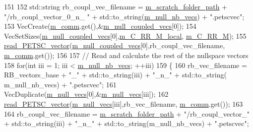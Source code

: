 \begin{DoxyCode}
151     
152     std::string rb\_coupl\_vec\_filename = \hyperlink{classcarl_1_1_f_e_t_i___operations_ad6d35bc9b5221d45452fbc8931f22055}{m\_scratch\_folder\_path} + \textcolor{stringliteral}{"/rb\_coupl\_vector\_0\_n\_
      "} + std::to\_string(\hyperlink{classcarl_1_1_f_e_t_i___operations_a6be71b08544858c4b4609bf2a2927a17}{m\_null\_nb\_vecs}) + \textcolor{stringliteral}{".petscvec"};
153     VecCreate(\hyperlink{classcarl_1_1_f_e_t_i___operations_a8cb0ed286667fc9f3ebc2d8ef2a3e13b}{m\_comm}.get(),&\hyperlink{classcarl_1_1_f_e_t_i___operations_a162af22ae7e7410cf5ce6fe07f301e63}{m\_null\_coupled\_vecs}[0]);
154     VecSetSizes(\hyperlink{classcarl_1_1_f_e_t_i___operations_a162af22ae7e7410cf5ce6fe07f301e63}{m\_null\_coupled\_vecs}[0],\hyperlink{classcarl_1_1_f_e_t_i___operations_a2401278970b5cc7087ebbf1746c64d35}{m\_C\_RR\_M\_local},
      \hyperlink{classcarl_1_1_f_e_t_i___operations_a8212c6fec9ded9faeb36cc3ce18f2e35}{m\_C\_RR\_M});
155     \hyperlink{namespacecarl_a4d0e2c60b0765dc8182c95362c5d329a}{read\_PETSC\_vector}(\hyperlink{classcarl_1_1_f_e_t_i___operations_a162af22ae7e7410cf5ce6fe07f301e63}{m\_null\_coupled\_vecs}[0],rb\_coupl\_vec\_filename, 
      \hyperlink{classcarl_1_1_f_e_t_i___operations_a8cb0ed286667fc9f3ebc2d8ef2a3e13b}{m\_comm}.get());
156 
157     \textcolor{comment}{// Read and calculate the rest of the nullspace vectors}
158     \textcolor{keywordflow}{for}(\textcolor{keywordtype}{int} iii = 1; iii < \hyperlink{classcarl_1_1_f_e_t_i___operations_a6be71b08544858c4b4609bf2a2927a17}{m\_null\_nb\_vecs}; ++iii)
159     \{
160         rb\_vec\_filename = RB\_vectors\_base + \textcolor{stringliteral}{"\_"} + std::to\_string(iii) + \textcolor{stringliteral}{"\_n\_"} + std::to\_string(
      m\_null\_nb\_vecs) + \textcolor{stringliteral}{".petscvec"};
161         VecDuplicate(\hyperlink{classcarl_1_1_f_e_t_i___operations_a81ca84aa058155a0a0f586625c6f93b7}{m\_null\_vecs}[0],&\hyperlink{classcarl_1_1_f_e_t_i___operations_a81ca84aa058155a0a0f586625c6f93b7}{m\_null\_vecs}[iii]);
162         \hyperlink{namespacecarl_a4d0e2c60b0765dc8182c95362c5d329a}{read\_PETSC\_vector}(\hyperlink{classcarl_1_1_f_e_t_i___operations_a81ca84aa058155a0a0f586625c6f93b7}{m\_null\_vecs}[iii],rb\_vec\_filename, 
      \hyperlink{classcarl_1_1_f_e_t_i___operations_a8cb0ed286667fc9f3ebc2d8ef2a3e13b}{m\_comm}.get());
163 
164         rb\_coupl\_vec\_filename = \hyperlink{classcarl_1_1_f_e_t_i___operations_ad6d35bc9b5221d45452fbc8931f22055}{m\_scratch\_folder\_path} + \textcolor{stringliteral}{"/rb\_coupl\_vector\_"} + 
      std::to\_string(iii) + \textcolor{stringliteral}{"\_n\_"} + std::to\_string(m\_null\_nb\_vecs) + \textcolor{stringliteral}{".petscvec"};

\end{DoxyCode}
